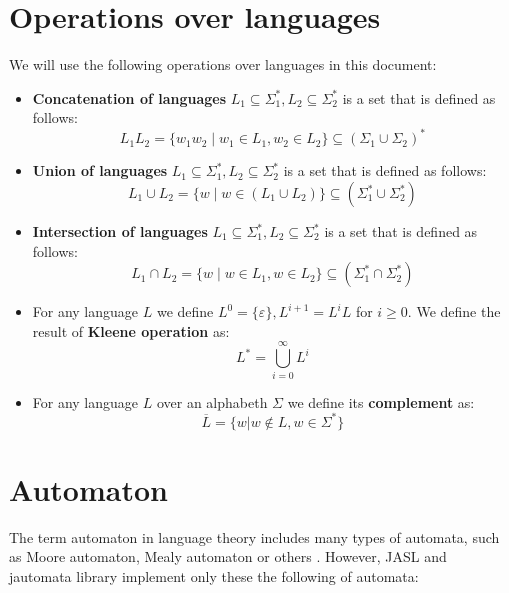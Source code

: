 \documentclass{ctuthesis}
\begin{document}
\section{Operations over languages}
\label{sec:operations-languages-def}
We will use the following operations over languages in this document:
\begin{itemize}
	\item \textbf{Concatenation of languages} $L_1 \subseteq \Sigma^*_1, L_2 \subseteq \Sigma^*_2$ is a set that is defined as follows:
	\begin{equation*}
		L_1L_2 = \{w_1w_2 \mid w_1 \in L_1, w_2 \in L_2\} \subseteq (\Sigma_1 \cup \Sigma_2)^*
	\end{equation*}
	
	\item \textbf{Union of languages} $L_1 \subseteq \Sigma^*_1, L_2 \subseteq \Sigma^*_2$ is a set that is defined as follows:
	\begin{equation*}
		L_1\cup L_2 = \{w \mid w \in (L_1 \cup L_2) \} \subseteq (\Sigma_1^* \cup \Sigma_2^*)
	\end{equation*}
	
	\item \textbf{Intersection of languages} $L_1 \subseteq \Sigma^*_1, L_2 \subseteq \Sigma^*_2$ is a set that is defined as follows:
	\begin{equation*}
		L_1 \cap L_2 = \{w \mid w \in L_1, w \in L_2 \} \subseteq (\Sigma^*_1 \cap \Sigma^*_2)
	\end{equation*}
	
	\item For any language $L$ we define $L^0 = \{\varepsilon\}, L^{i+1} = L^iL$ for $i \geq 0$. We define the result of \textbf{Kleene operation} as:
	\begin{equation*}
		L^* = \bigcup^{\infty}_{i=0} L^i
	\end{equation*}
	
	\item For any language $L$ over an alphabeth $\Sigma$ we define its \textbf{complement} as: 
	\begin{equation*}
		\overline{L} = \{w | w \not \in L, w \in \Sigma^*\}
	\end{equation*}
\end{itemize}

\section{Automaton}
\label{sec:automaton-def}
The term automaton in language theory includes many types of automata, such as Moore automaton, Mealy automaton or others \cite{melichar}. However, JASL and jautomata library implement only these the following of automata:
\end{document}
